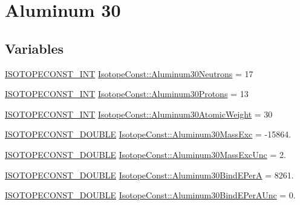 \hypertarget{group___isotope_const-_aluminum-_al30}{}\section{Aluminum 30}
\label{group___isotope_const-_aluminum-_al30}
\subsection*{Variables}
\begin{DoxyCompactItemize}
\item 
\mbox{\hyperlink{group___isotope_const-_macros_ga5f18360b3e99483a35c32d789e62621c}{I\+S\+O\+T\+O\+P\+E\+C\+O\+N\+S\+T\+\_\+\+I\+NT}} \mbox{\hyperlink{group___isotope_const-_aluminum-_al30_ga75bada827a73a2d2b3d0af0113a31448}{Isotope\+Const\+::\+Aluminum30\+Neutrons}} = 17
\item 
\mbox{\hyperlink{group___isotope_const-_macros_ga5f18360b3e99483a35c32d789e62621c}{I\+S\+O\+T\+O\+P\+E\+C\+O\+N\+S\+T\+\_\+\+I\+NT}} \mbox{\hyperlink{group___isotope_const-_aluminum-_al30_ga40e144b601fa502bb95a6fbaf54033ef}{Isotope\+Const\+::\+Aluminum30\+Protons}} = 13
\item 
\mbox{\hyperlink{group___isotope_const-_macros_ga5f18360b3e99483a35c32d789e62621c}{I\+S\+O\+T\+O\+P\+E\+C\+O\+N\+S\+T\+\_\+\+I\+NT}} \mbox{\hyperlink{group___isotope_const-_aluminum-_al30_ga6a1a71ee6ba49e4a3dad53cde717988b}{Isotope\+Const\+::\+Aluminum30\+Atomic\+Weight}} = 30
\item 
\mbox{\hyperlink{group___isotope_const-_macros_ga8f45a7272ce02c0b4c65c44636ed719a}{I\+S\+O\+T\+O\+P\+E\+C\+O\+N\+S\+T\+\_\+\+D\+O\+U\+B\+LE}} \mbox{\hyperlink{group___isotope_const-_aluminum-_al30_ga8f3b981c7ca5751abdde9842e87b773a}{Isotope\+Const\+::\+Aluminum30\+Mass\+Exc}} = -\/15864.
\item 
\mbox{\hyperlink{group___isotope_const-_macros_ga8f45a7272ce02c0b4c65c44636ed719a}{I\+S\+O\+T\+O\+P\+E\+C\+O\+N\+S\+T\+\_\+\+D\+O\+U\+B\+LE}} \mbox{\hyperlink{group___isotope_const-_aluminum-_al30_ga109295070fb30064c88223f1e4fff833}{Isotope\+Const\+::\+Aluminum30\+Mass\+Exc\+Unc}} = 2.
\item 
\mbox{\hyperlink{group___isotope_const-_macros_ga8f45a7272ce02c0b4c65c44636ed719a}{I\+S\+O\+T\+O\+P\+E\+C\+O\+N\+S\+T\+\_\+\+D\+O\+U\+B\+LE}} \mbox{\hyperlink{group___isotope_const-_aluminum-_al30_ga78d5381a4200fcb1a053d18b75ae27e3}{Isotope\+Const\+::\+Aluminum30\+Bind\+E\+PerA}} = 8261.
\item 
\mbox{\hyperlink{group___isotope_const-_macros_ga8f45a7272ce02c0b4c65c44636ed719a}{I\+S\+O\+T\+O\+P\+E\+C\+O\+N\+S\+T\+\_\+\+D\+O\+U\+B\+LE}} \mbox{\hyperlink{group___isotope_const-_aluminum-_al30_ga9711062c069af733d702bb1ccf20466f}{Isotope\+Const\+::\+Aluminum30\+Bind\+E\+Per\+A\+Unc}} = 0.

\end{DoxyCompactItemize}
